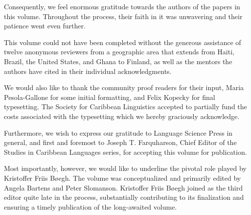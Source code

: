 \documentclass[output=paper,colorlinks,citecolor=brown]{langscibook}
\begin{document}
Consequently, we feel enormous gratitude towards the authors of the papers in this volume. Throughout the process, their faith in it was unwavering and their patience went even further.

This volume could not have been completed without the generous assistance of twelve anonymous reviewers from a geographic area that extends from Haiti, Brazil, the United States, and Ghana to Finland, as well as the mentors the authors have cited in their individual acknowledgments. 

We would also like to thank the community proof readers for their input, Maria Pesola-Gallone for some initial formatting, and Felix Kopecky for final typesetting. The Society for Caribbean Linguistics accepted to partially fund the costs associated with the typesetting which we hereby graciously acknowledge.

Furthermore, we wish to express our gratitude to Language Science Press in general, and first and foremost to Joseph T. Farquharson, Chief Editor of the Studies in Caribbean Languages series, for accepting this volume for publication.

Most importantly, however, we would like to underline the pivotal role played by Kristoffer Friis Bøegh. The volume was conceptualized and primarily edited by Angela Bartens and Peter Slomanson. Kristoffer Friis Bøegh joined as the third editor quite late in the process, substantially contributing to its finalization and ensuring a timely publication of the long-awaited volume.

\printbibliography[heading=subbibliography,notkeyword=this]
\end{document}
